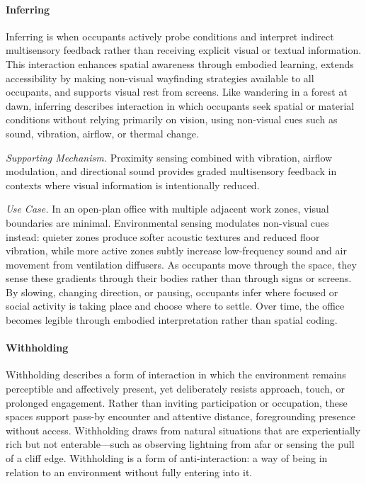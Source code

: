 \paragraph{\textbf{Inferring}}
Inferring is when occupants actively probe conditions and interpret indirect multisensory feedback rather than receiving explicit visual or textual information. This interaction enhances spatial awareness through embodied learning, extends accessibility by making non-visual wayfinding strategies available to all occupants, and supports visual rest from screens. Like wandering in a forest at dawn, inferring describes interaction in which occupants seek spatial or material conditions without relying primarily on vision, using non-visual cues such as sound, vibration, airflow, or thermal change. 

\emph{Supporting Mechanism.} Proximity sensing combined with vibration, airflow modulation, and directional sound provides graded multisensory feedback in contexts where visual information is intentionally reduced.

\emph{Use Case.} In an open-plan office with multiple adjacent work zones, visual boundaries are  minimal. Environmental sensing modulates non-visual cues instead: quieter zones produce softer acoustic textures and reduced floor vibration, while more active zones subtly increase low-frequency sound and air movement from ventilation diffusers. As occupants move through the space, they sense these gradients through their bodies rather than through signs or screens. By slowing, changing direction, or pausing, occupants infer where focused or social activity is taking place and choose where to settle. Over time, the office becomes legible through embodied interpretation rather than spatial coding.

\paragraph{\textbf{Withholding}}
Withholding describes a form of interaction in which the environment remains perceptible and affectively present, yet deliberately resists approach, touch, or prolonged engagement. Rather than inviting participation or occupation, these spaces support pass-by encounter and attentive distance, foregrounding presence without access. Withholding draws from natural situations that are experientially rich but not enterable---such as observing lightning from afar or sensing the pull of a cliff edge. Withholding is a form of anti-interaction: a way of being in relation to an environment without fully entering into it.

